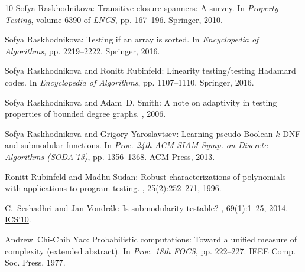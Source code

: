 \documentclass[11pt]{article}
\numberwithin{equation}{section}
\theoremstyle{definition}
\theoremstyle{plain}
\begin{document}
\begin{thebibliography}{10}
{\sc Sofya Raskhodnikova}: Transitive-closure spanners: {A} survey.
\newblock In {\em Property Testing}, volume 6390 of {\em LNCS}, pp. 167--196.
  Springer, 2010.
\newblock [\epfmtdoi{10.1007/978-3-642-16367-8\_10}]

{\sc Sofya Raskhodnikova}: Testing if an array is sorted.
\newblock In {\em Encyclopedia of Algorithms}, pp. 2219--2222. Springer, 2016.
\newblock [\epfmtdoi{10.1007/978-1-4939-2864-4\_700}]

{\sc Sofya Raskhodnikova and Ronitt Rubinfeld}: Linearity testing/testing
  {Hadamard} codes.
\newblock In {\em Encyclopedia of Algorithms}, pp. 1107--1110. Springer, 2016.
\newblock [\epfmtdoi{10.1007/978-1-4939-2864-4\_202}]

{\sc Sofya Raskhodnikova and Adam~D. Smith}: A note on adaptivity in testing
  properties of bounded degree graphs.
, 2006.

{\sc Sofya Raskhodnikova and Grigory Yaroslavtsev}: Learning pseudo-{Boolean}
  $k$-{DNF} and submodular functions.
\newblock In {\em Proc. 24th ACM-SIAM Symp. on Discrete Algorithms (SODA'13)},
  pp. 1356--1368. ACM Press, 2013.

{\sc Ronitt Rubinfeld and Madhu Sudan}: Robust characterizations of polynomials
  with applications to program testing.
, 25(2):252--271, 1996.
\newblock [\epfmtdoi{10.1137/S0097539793255151}]

{\sc C.~Seshadhri and Jan Vondr{\'{a}}k}: Is submodularity testable?
, 69(1):1--25, 2014.
\newblock \prelim
  \href{https://conference.iiis.tsinghua.edu.cn/ICS2011/content/papers/21.html}{ICS'10}.

{\sc Andrew~Chi{-}Chih Yao}: Probabilistic computations: Toward a unified
  measure of complexity (extended abstract).
\newblock In {\em Proc. 18th FOCS}, pp. 222--227. IEEE Comp. Soc. Press, 1977.

\end{thebibliography}
\end{document}
